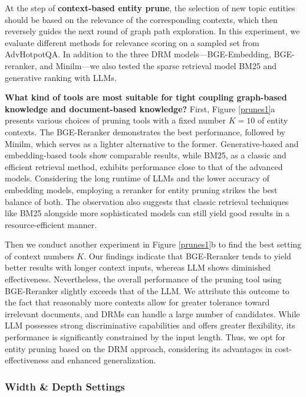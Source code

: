 \documentclass{article} %
\begin{document}
At the step of \textbf{context-based entity prune}, the selection of new topic entities should be based on the relevance of the corresponding contexts, which then reversely guides the next round of graph path exploration. In this experiment, we evaluate different methods for relevance scoring on a sampled set from AdvHotpotQA. In addition to the three DRM models—BGE-Embedding, BGE-reranker, and Minilm—we also tested the sparse retrieval model BM25 and generative ranking with LLMs.

\textbf{What kind of tools are most suitable for tight coupling graph-based knowledge and document-based knowledge?} 
First, Figure \ref{prunes1}a presents various choices of pruning tools with a fixed number $K = 10$ of entity contexts. The BGE-Reranker demonstrates the best performance, followed by Minilm, which serves as a lighter alternative to the former. Generative-based and embedding-based tools show comparable results, while BM25, as a classic and efficient retrieval method, exhibits performance close to that of the advanced models. Considering the long runtime of LLMs and the lower accuracy of embedding models, employing a reranker for entity pruning strikes the best balance of both. The observation also suggests that classic retrieval techniques like BM25 alongside more sophisticated models can still yield good results in a resource-efficient manner.

Then we conduct another experiment in Figure \ref{prunes1}b to find the best setting of context numbers $K$. Our findings indicate that BGE-Reranker tends to yield better results with longer context inputs, whereas LLM shows diminished effectiveness. Nevertheless, the overall performance of the pruning tool using BGE-Reranker slightly exceeds that of the LLM. We attribute this outcome to the fact that reasonably more contexts allow for greater tolerance toward irrelevant documents, and DRMs can handle a large number of candidates. While LLM possesses strong discriminative capabilities and offers greater flexibility, its performance is significantly constrained by the input length. Thus, we opt for entity pruning based on the DRM approach, considering its advantages in cost-effectiveness and enhanced generalization.



\subsubsection{Width \& Depth Settings}
\end{document}
